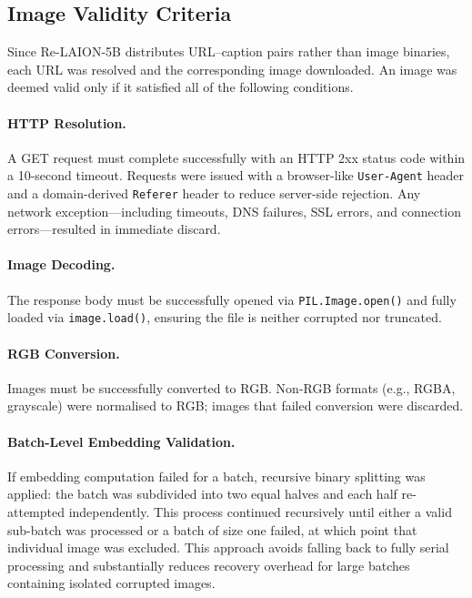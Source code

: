 \subsection{Image Validity Criteria}

Since Re-LAION-5B distributes URL--caption pairs rather than image
binaries, each URL was resolved and the corresponding image downloaded. An
image was deemed valid only if it satisfied all of the following conditions.

\paragraph{HTTP Resolution.} A GET request must complete successfully with
an HTTP 2xx status code within a 10-second timeout. Requests were issued
with a browser-like \texttt{User-Agent} header and a domain-derived
\texttt{Referer} header to reduce server-side rejection. Any network
exception---including timeouts, DNS failures, SSL errors, and connection
errors---resulted in immediate discard.

\paragraph{Image Decoding.} The response body must be successfully opened
via \texttt{PIL.Image.open()} and fully loaded via \texttt{image.load()},
ensuring the file is neither corrupted nor truncated.

\paragraph{RGB Conversion.} Images must be successfully converted to RGB.
Non-RGB formats (e.g., RGBA, grayscale) were normalised to RGB; images that
failed conversion were discarded.

\paragraph{Batch-Level Embedding Validation.} If embedding computation
failed for a batch, recursive binary splitting was applied: the batch was
subdivided into two equal halves and each half re-attempted independently.
This process continued recursively until either a valid sub-batch was
processed or a batch of size one failed, at which point that individual
image was excluded. This approach avoids falling back to fully serial
processing and substantially reduces recovery overhead for large batches
containing isolated corrupted images.


